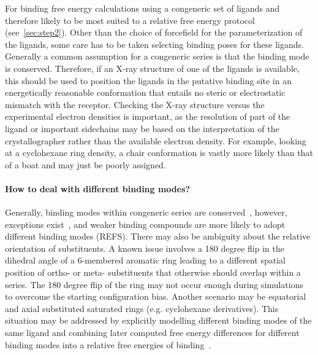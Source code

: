 \documentclass[9pt,bestpractices]{livecoms}
\begin{document}
For binding free energy calculations using a congeneric set of ligands and therefore likely to be most suited to a relative free energy protocol (see~\ref{sec:step2}). Other than the choice of forcefield for the parameterization of the ligands, some care has to be taken selecting binding poses for these ligands. Generally a common assumption for a congeneric series is that the binding mode is conserved. Therefore, if an X-ray structure of one of the ligands is available, this should be used to position the ligands in the putative binding site in an energetically reasonable conformation that entails no steric or electrostatic mismatch with the receptor. Checking the X-ray structure versus the experimental electron densities is important, as the resolution of part of the ligand or important sidechains may be based on the interpretation of the crystallographer rather than the available electron density. For example, looking at a cyclohexane ring density, a chair conformation is vastly more likely than that of a boat and may just be poorly assigned. 

\paragraph{How to deal with different binding modes?}
Generally, binding modes within congeneric series are conserved~\cite{}, however, exceptions exist~\cite{}, and weaker binding compounds are more likely to adopt different binding modes (REFS). There may also be ambiguity about the relative orientation of substituents. A known issue involves a 180 degree flip in the dihedral angle of a 6-membered aromatic ring leading to a different spatial position of ortho- or meta- substituents that otherwise should overlap within a series. The 180 degree flip of the ring may not occur enough during simulations to overcome the starting configuration bias. Another scenario may be equatorial and axial substituted saturated rings (e.g. cyclohexane derivatives). This situation may be addressed by explicitly modelling different binding modes of the same ligand and combining later computed free energy differences for different binding modes into a relative free energies of binding~\cite{kaus2015how}.
\end{document}
